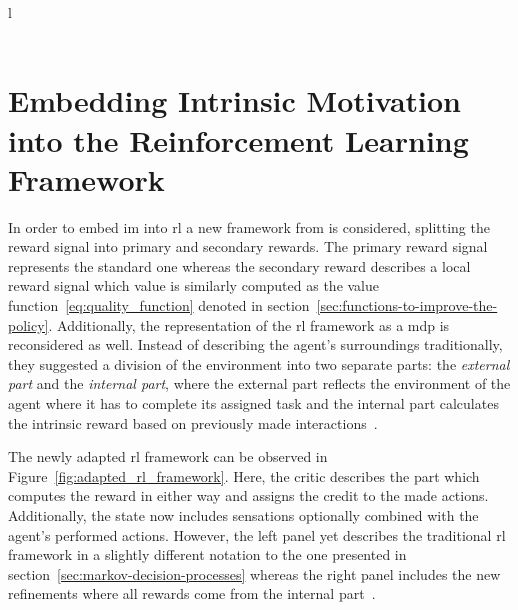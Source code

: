 \documentclass[draft,final]{vutinfth} %
\newcommand{\p}[1]{see p. #1}
\begin{document}
\begin{table}[h]
\begin{tabular}{l}
                                                                                                                          \\ \hline
                                                     \\ \hline
        \end{tabular}
        \caption[Classification of \glspl{im} in \gls{rl}]{Classification of \glspl{im} in \gls{rl}\protect\footnotemark[2]}
        \label{tab:clasification_im_rl}
    \end{table}
    \footnotetext[2]{\citep[\p{9}]{aubret_survey_2019}}


    \section{Embedding Intrinsic Motivation into the Reinforcement Learning Framework}\label{sec:embeddingglsinto-theglsframework}

    In order to embed \gls{im} into \gls{rl} a new framework from \citeauthor{singh_intrinsically_2010} is considered, splitting the reward signal into primary and secondary rewards.
    The primary reward signal represents the standard one whereas the secondary reward describes a local reward signal which value is similarly computed as the value function~\eqref{eq:quality_function} denoted in section~\ref{sec:functions-to-improve-the-policy}.
    Additionally, the representation of the \gls{rl} framework as a \gls{mdp} is reconsidered as well.
    Instead of describing the agent's surroundings traditionally, they suggested a division of the environment into two separate parts: the \textit{external part} and the \textit{internal part}, where the external part reflects the environment of the agent where it has to complete its assigned task and the internal part calculates the intrinsic reward based on previously made interactions~\citep{aubret_survey_2019}.

    The newly adapted \gls{rl} framework can be observed in Figure~\ref{fig:adapted_rl_framework}.
    Here, the critic describes the part which computes the reward in either way and assigns the credit to the made actions.
    Additionally, the state now includes sensations optionally combined with the agent's performed actions.
    However, the left panel yet describes the traditional \gls{rl} framework in a slightly different notation to the one presented in section~\ref{sec:markov-decision-processes} whereas the right panel includes the new refinements where all rewards come from the internal part~\citep{singh_intrinsically_2010}.
\end{document}
